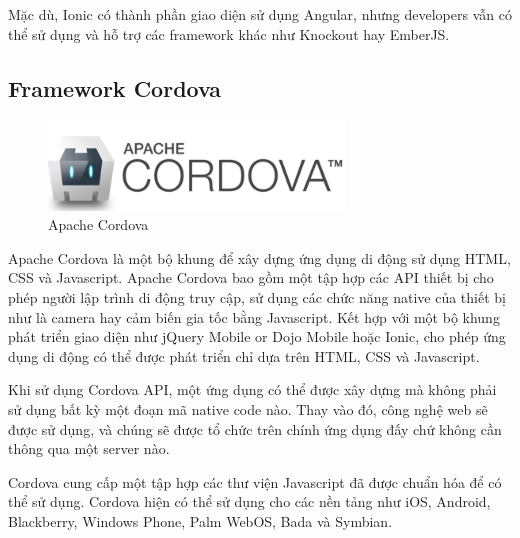 Mặc dù, Ionic có thành phần giao diện sử dụng Angular, nhưng developers vẫn có thể sử dụng và hỗ trợ các framework khác như Knockout hay EmberJS.



\subsection{Framework Cordova}

\begin{figure}[H]
	\centering    
	\includegraphics[width=0.7\textwidth]{cordova}
	\caption[Apache Cordova ]{Apache Cordova}
	\label{fig:cordova}
\end{figure}

Apache Cordova là một bộ khung để xây dựng ứng dụng di động sử dụng HTML, CSS và Javascript. Apache Cordova bao gồm một tập hợp các API thiết bị cho phép người lập trình di động truy cập, sử dụng các chức năng native của thiết bị như là camera hay cảm biến gia tốc bằng Javascript. Kết hợp với một bộ khung phát triển giao diện như jQuery Mobile or Dojo Mobile hoặc Ionic, cho phép ứng dụng di động có thể được phát triển chỉ dựa trên HTML, CSS và Javascript.

Khi sử dụng Cordova API, một ứng dụng có thể được xây dựng mà không phải sử dụng bất kỳ một đoạn mã native code nào. Thay vào đó, công nghệ web sẽ được sử dụng, và chúng sẽ được tổ chức trên chính ứng dụng đấy chứ không cần thông qua một server nào.

Cordova cung cấp một tập hợp các thư viện Javascript đã được chuẩn hóa để có thể sử dụng. Cordova hiện có thể sử dụng cho các nền tảng như iOS, Android, Blackberry, Windows Phone, Palm WebOS, Bada và Symbian.

